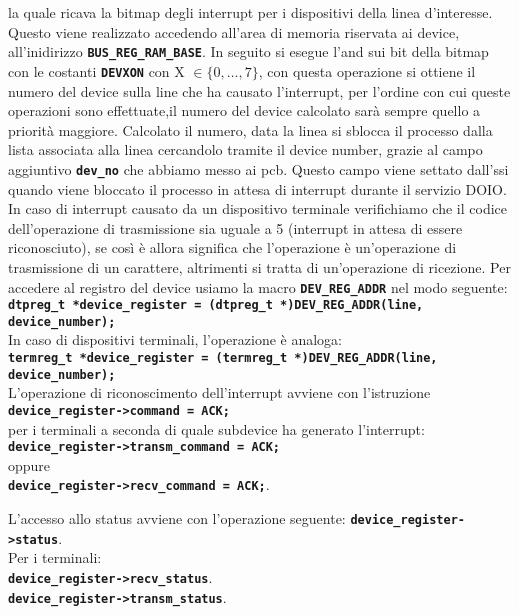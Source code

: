 \documentclass{article}
\begin{document}
la quale ricava la bitmap degli interrupt per i dispositivi della linea d'interesse. Questo viene realizzato accedendo 
all'area di memoria riservata ai device, all'inidirizzo \texttt{\textbf{BUS\_REG\_RAM\_BASE}}.
In seguito si esegue l'and sui bit della bitmap con le costanti \texttt{\textbf{DEVXON}} con X $\in \{0, \ldots, 7\}$, 
con questa operazione si ottiene il numero del device sulla line che ha causato l'interrupt, per l'ordine con cui queste 
operazioni sono effettuate,il numero del device calcolato sarà sempre quello a priorità maggiore. 
Calcolato il numero, data la linea si sblocca il processo dalla lista associata alla linea cercandolo tramite il device 
number, grazie al campo aggiuntivo \texttt{\textbf{dev\_no}} che abbiamo messo ai pcb. Questo campo viene settato dall'ssi 
quando viene bloccato il processo in attesa di interrupt durante il servizio DOIO. In caso di interrupt causato da un 
dispositivo terminale verifichiamo che il codice dell'operazione di trasmissione sia uguale a 5 (interrupt in attesa di 
essere riconosciuto), se così è allora significa che l'operazione è un'operazione di trasmissione di un carattere, altrimenti 
si tratta di un'operazione di ricezione.
Per accedere al registro del device usiamo la macro \texttt{\textbf{DEV\_REG\_ADDR}} nel modo seguente: \\
\texttt{\textbf{dtpreg\_t *device\_register = (dtpreg\_t *)DEV\_REG\_ADDR(line, device\_number);}} \\
In caso di dispositivi terminali, l'operazione è analoga: \\
\texttt{\textbf{termreg\_t *device\_register = (termreg\_t *)DEV\_REG\_ADDR(line, device\_number);}} \\
L'operazione di riconoscimento dell'interrupt avviene con l'istruzione\\ \texttt{\textbf{device\_register->command = ACK;}} 
\\per i terminali a seconda di quale subdevice ha generato l'interrupt: \\ \texttt{\textbf{device\_register->transm\_command = ACK;}} \\ oppure \\ \texttt{\textbf{device\_register->recv\_command = ACK;}}.

L'accesso allo status avviene con l'operazione seguente: 
\texttt{\textbf{device\_register->status}}. \\
Per i terminali: \\
\texttt{\textbf{device\_register->recv\_status}}. \\
\texttt{\textbf{device\_register->transm\_status}}.
\end{document}
